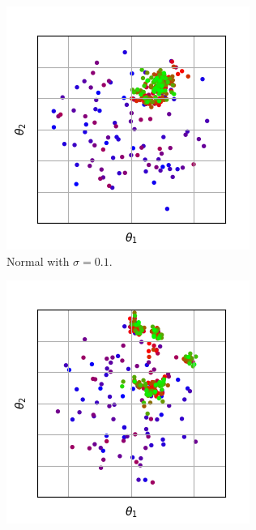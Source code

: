 \documentclass{llncs}
\begin{document}
\begin{figure}[t]
\begin{subfigure}[t]{0.24\textwidth}
        \includegraphics[width=\textwidth]{figures/mutation/simple_normal-100-10_none_normal-0.1_0-1.png}
        \caption{Normal with $\sigma=0.1$.}
        \label{subfig:mutation_normal_01}
    \end{subfigure}
    \begin{subfigure}[t]{0.24\textwidth}
        \centering
        \captionsetup{width=.9\textwidth}
        \includegraphics[width=\textwidth]{figures/mutation/simple_normal-100-10_none_onestep_0-1.png}

\end{subfigure}
\end{figure}
\end{document}
